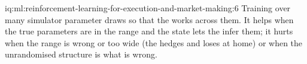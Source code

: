 \begin{solution}{iq:ml:reinforcement-learning-for-execution-and-market-making:6}
Training over many simulator parameter draws so that the  works across them. It helps when the true parameters are in
the range and the state lets the  infer them; it hurts when the range is wrong or too wide (the  hedges and loses
at home) or when the unrandomised structure is what is wrong.
\end{solution}
